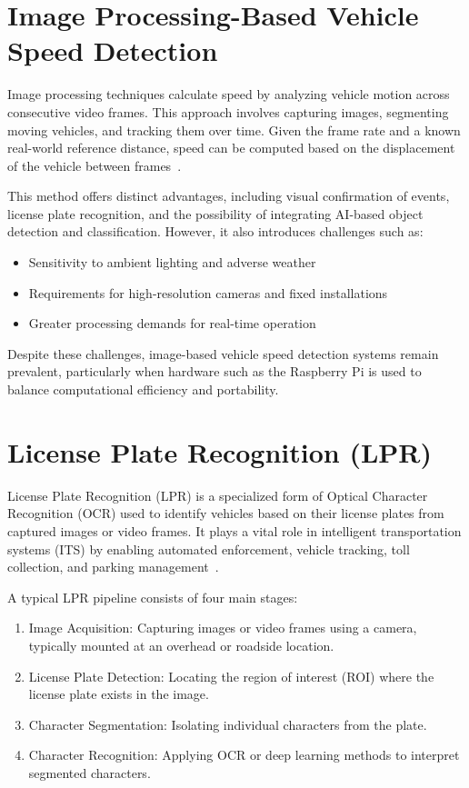 \section*{Image Processing-Based Vehicle Speed Detection}

Image processing techniques calculate speed by analyzing vehicle motion across consecutive video frames. This approach involves capturing images, segmenting moving vehicles, and tracking them over time. Given the frame rate and a known real-world reference distance, speed can be computed based on the displacement of the vehicle between frames~\cite{image_processing_speed_detection}.

This method offers distinct advantages, including visual confirmation of events, license plate recognition, and the possibility of integrating AI-based object detection and classification. However, it also introduces challenges such as:
\begin{itemize}
    \item Sensitivity to ambient lighting and adverse weather
    \item Requirements for high-resolution cameras and fixed installations
    \item Greater processing demands for real-time operation
\end{itemize}

Despite these challenges, image-based vehicle speed detection systems remain prevalent, particularly when hardware such as the Raspberry Pi is used to balance computational efficiency and portability.

\section*{License Plate Recognition (LPR)}

License Plate Recognition (LPR) is a specialized form of Optical Character Recognition (OCR) used to identify vehicles based on their license plates from captured images or video frames. It plays a vital role in intelligent transportation systems (ITS) by enabling automated enforcement, vehicle tracking, toll collection, and parking management~\cite{lpr_survey}.

A typical LPR pipeline consists of four main stages:
\begin{enumerate}
    \item {Image Acquisition:} Capturing images or video frames using a camera, typically mounted at an overhead or roadside location.
    \item {License Plate Detection:} Locating the region of interest (ROI) where the license plate exists in the image.
    \item {Character Segmentation:} Isolating individual characters from the plate.
    \item {Character Recognition:} Applying OCR or deep learning methods to interpret segmented characters.
\end{enumerate}

